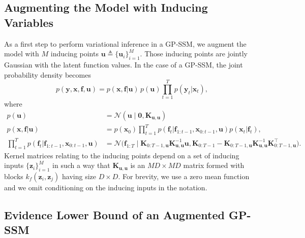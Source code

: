 \documentclass{article} %
\newcommand{\n}[1]{\mathbf{#1}}
\newcommand{\x}{\mathbf{x}}
\newcommand{\y}{\mathbf{y}}
\begin{document}
\subsection{Augmenting the Model with Inducing Variables}
\label{sec:inducing} 

As a first step to perform variational inference in a GP-SSM, we augment the model with $M$ inducing points $\n{u} \triangleq \{\n{u}_i\}_{i=1}^M$. Those inducing points are jointly Gaussian with the latent function values. In the case of a GP-SSM, the joint probability density becomes
\vspace{-1mm}
\begin{equation}
\label{eq:jointwithu}
	p(\y,\x,\n{f},\n{u}) = p(\x,\n{f} | \n{u}) \, p(\n{u}) \prod_{t=1}^T p(\y_t | \x_t),
\end{equation}
where
\begin{subequations}
\begin{align}
p(\n{u}) &= \mathcal{N}(\n{u} \mid \n{0}, \n{K}_{\n{u},\n{u}}) \\
p(\x,\n{f} | \n{u}) &= p(\x_0) \prod_{t=1}^T p(\n{f}_t | \n{f}_{1:t-1},\x_{0:t-1},\n{u})  p(\x_t | \n{f}_t), \\ 
\!\!\!\prod_{t=1}^T p(\n{f}_t | \n{f}_{1:t-1},\x_{0:t-1},\n{u}) &= \mathcal{N}\big( \n{f}_{1:T} \mid  \n{K}_{0:T-1,\n{u}}  \n{K}_{\n{u},\n{u}}^{-1} \n{u} , \n{K}_{0:T-1} \!- \n{K}_{0:T-1,\n{u}}  \n{K}_{\n{u},\n{u}}^{-1} \n{K}_{0:T-1,\n{u}}^\top  \big).
\end{align}
\end{subequations}
Kernel matrices relating to the inducing points depend on a set of inducing inputs $\{\n{z}_i\}_{i=1}^M$ in such a way that $\n{K}_{\n{u},\n{u}}$ is an $MD \times MD$ matrix formed with blocks $k_f(\n{z}_i, \n{z}_j)$ having size $D \times D$. For brevity, we use a zero mean function and we omit conditioning on the inducing inputs in the notation.




\subsection{Evidence Lower Bound of an Augmented GP-SSM}
\label{sec:elbo}
\end{document}
